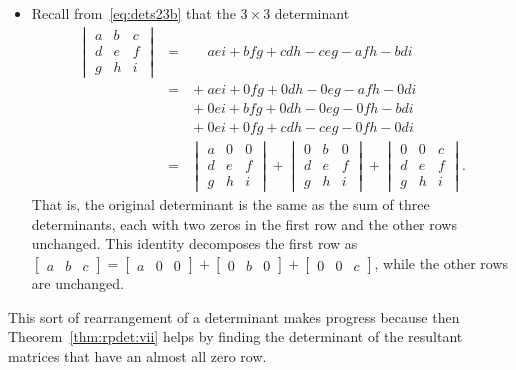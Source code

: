 \begin{example}
\begin{itemize}
\item Recall from~\eqref{eq:dets23b} that the \(3\times3\) determinant
\begin{eqnarray*}
\begin{vmatrix} a&b&c\\d&e&f\\g&h&i \end{vmatrix}
&=&\phantom{{}+}aei+bfg+cdh-ceg-afh-bdi
\\&=&{}+aei+0fg+0dh-0eg-afh-0di
\\&&{}+0ei+bfg+0dh-0eg-0fh-bdi
\\&&{}+0ei+0fg+cdh-ceg-0fh-0di
\\&=&\begin{vmatrix} a&0&0\\d&e&f\\g&h&i \end{vmatrix}
+\begin{vmatrix} 0&b&0\\d&e&f\\g&h&i \end{vmatrix}
+\begin{vmatrix} 0&0&c\\d&e&f\\g&h&i \end{vmatrix}.
\end{eqnarray*}
That is, the original determinant is the same as the sum of three determinants, each with two zeros in the first row and the other rows unchanged.
This identity decomposes the first row as \(\begin{bmatrix} a&b&c \end{bmatrix}=\begin{bmatrix} a&0&0 \end{bmatrix}+\begin{bmatrix} 0&b&0 \end{bmatrix}+\begin{bmatrix} 0&0&c \end{bmatrix}\), while the other rows are unchanged.
\end{itemize}
This sort of rearrangement of a determinant makes progress because then Theorem~\ref{thm:rpdet:vii} helps by finding the determinant of the resultant matrices that have an almost all zero row.
\end{example}

